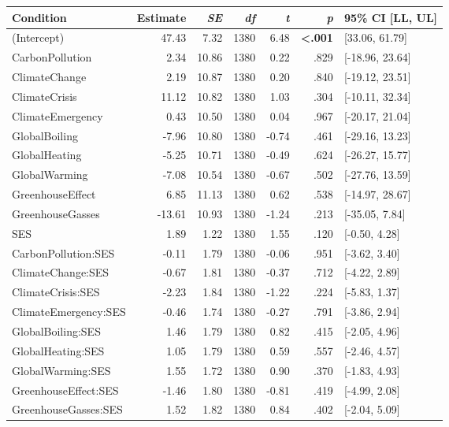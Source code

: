 \begin{table}[ht]
\centering
\begin{tabular}{lrrrrrl}
  \hline
Condition & Estimate & \textit{SE} & \textit{df} & \textit{t} & \textit{p} & 95\% CI [LL, UL] \\ 
  \hline
(Intercept) & 47.43 & 7.32 & 1380 & 6.48 & \textbf{\textless  .001} & [33.06, 61.79] \\ 
  CarbonPollution & 2.34 & 10.86 & 1380 & 0.22 & .829 & [-18.96, 23.64] \\ 
  ClimateChange & 2.19 & 10.87 & 1380 & 0.20 & .840 & [-19.12, 23.51] \\ 
  ClimateCrisis & 11.12 & 10.82 & 1380 & 1.03 & .304 & [-10.11, 32.34] \\ 
  ClimateEmergency & 0.43 & 10.50 & 1380 & 0.04 & .967 & [-20.17, 21.04] \\ 
  GlobalBoiling & -7.96 & 10.80 & 1380 & -0.74 & .461 & [-29.16, 13.23] \\ 
  GlobalHeating & -5.25 & 10.71 & 1380 & -0.49 & .624 & [-26.27, 15.77] \\ 
  GlobalWarming & -7.08 & 10.54 & 1380 & -0.67 & .502 & [-27.76, 13.59] \\ 
  GreenhouseEffect & 6.85 & 11.13 & 1380 & 0.62 & .538 & [-14.97, 28.67] \\ 
  GreenhouseGasses & -13.61 & 10.93 & 1380 & -1.24 & .213 & [-35.05, 7.84] \\ 
  SES & 1.89 & 1.22 & 1380 & 1.55 & .120 & [-0.50, 4.28] \\ 
  CarbonPollution:SES & -0.11 & 1.79 & 1380 & -0.06 & .951 & [-3.62, 3.40] \\ 
  ClimateChange:SES & -0.67 & 1.81 & 1380 & -0.37 & .712 & [-4.22, 2.89] \\ 
  ClimateCrisis:SES & -2.23 & 1.84 & 1380 & -1.22 & .224 & [-5.83, 1.37] \\ 
  ClimateEmergency:SES & -0.46 & 1.74 & 1380 & -0.27 & .791 & [-3.86, 2.94] \\ 
  GlobalBoiling:SES & 1.46 & 1.79 & 1380 & 0.82 & .415 & [-2.05, 4.96] \\ 
  GlobalHeating:SES & 1.05 & 1.79 & 1380 & 0.59 & .557 & [-2.46, 4.57] \\ 
  GlobalWarming:SES & 1.55 & 1.72 & 1380 & 0.90 & .370 & [-1.83, 4.93] \\ 
  GreenhouseEffect:SES & -1.46 & 1.80 & 1380 & -0.81 & .419 & [-4.99, 2.08] \\ 
  GreenhouseGasses:SES & 1.52 & 1.82 & 1380 & 0.84 & .402 & [-2.04, 5.09] \\ 
   \hline
\end{tabular}
\end{table}
